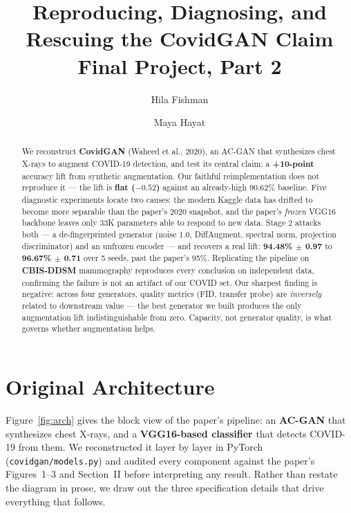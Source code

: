 \documentclass[11pt]{article}
\title{\textbf{Reproducing, Diagnosing, and Rescuing the CovidGAN Claim}\\[2pt] 
\normalsize Final Project, Part 2 }
\author{Hila Fishman \and Maya Hayat}
\date{}
\newcommand{\code}[1]{\texttt{#1}}
\begin{document}
 
\maketitle 
\vspace{-2.0em}

\begin{abstract}
We reconstruct \textbf{CovidGAN} (Waheed et al., 2020), an AC-GAN that synthesizes chest X-rays to augment COVID-19 detection, and test its central claim: a \textbf{+10-point} accuracy lift from synthetic augmentation. Our faithful reimplementation does not reproduce it --- the lift is \textbf{flat ($-0.52$)} against an already-high 90.62\% baseline. Five diagnostic experiments locate two causes: the modern Kaggle data has drifted to become more separable than the paper's 2020 snapshot, and the paper's \emph{frozen} VGG16 backbone leaves only 33K parameters able to respond to new data. Stage 2 attacks both --- a de-fingerprinted generator (noise 1.0, DiffAugment, spectral norm, projection discriminator) and an unfrozen encoder --- and recovers a real lift: \textbf{94.48\% $\pm$ 0.97} to \textbf{96.67\% $\pm$ 0.71} over 5 seeds, past the paper's 95\%. Replicating the pipeline on \textbf{CBIS-DDSM} mammography reproduces every conclusion on independent data, confirming the failure is not an artifact of our COVID set. Our sharpest finding is negative: across four generators, quality metrics (FID, transfer probe) are \emph{inversely} related to downstream value --- the best generator we built produces the only augmentation lift indistinguishable from zero. Capacity, not generator quality, is what governs whether augmentation helps.
\end{abstract}

\section{Original Architecture} \label{sec:original_architecture}
Figure~\ref{fig:arch} gives the block view of the paper's pipeline: an \textbf{AC-GAN} that synthesizes chest X-rays, and a \textbf{VGG16-based classifier} that detects COVID-19 from them. We reconstructed it layer by layer in PyTorch (\code{covidgan/models.py}) and audited every component against the paper's Figures~1--3 and Section~II before interpreting any result. Rather than restate the diagram in prose, we draw out the three specification details that drive everything that follows.
\end{document}
